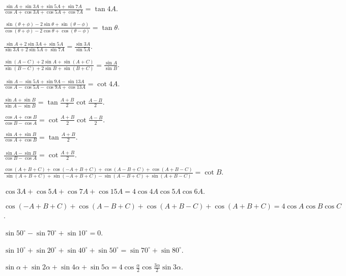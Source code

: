 \item $\frac{\sin A + \sin 3A + \sin 5A + \sin 7A}{\cos A + \cos 3A + \cos 5A + \cos 7A} = \tan 4A$.

\item $\frac{\sin (\theta + \phi) - 2\sin\theta + \sin (\theta - \phi)}{\cos (\theta + \phi) - 2\cos \theta + \cos(\theta -
    \phi)} = \tan\theta$.

\item $\frac{\sin A + 2\sin 3A + \sin 5A}{\sin 3A + 2\sin 5A + \sin 7A} = \frac{\sin 3A}{\sin 5A}$.

\item $\frac{\sin(A - C) + 2\sin A + \sin(A + C)}{\sin (B - C) + 2\sin B + \sin(B + C)} = \frac{\sin A}{\sin B}$.

\item $\frac{\sin A - \sin 5A + \sin 9A - \sin 13A}{\cos A - \cos 5A - \cos 9A + \cos 13 A} = \cot 4A$.

\item $\frac{\sin A + \sin B}{\sin A - \sin B} = \tan \frac{A + B}{2}\cot \frac{A - B}{2}$.

\item $\frac{\cos A + \cos B}{\cos B - \cos A} = \cot \frac{A + B}{2}\cot \frac{A - B}{2}$.

\item $\frac{\sin A + \sin B}{\cos A + \cos B} = \tan \frac{A + B}{2}$.

\item $\frac{\sin A - \sin B}{\cos B - \cos A} = \cot \frac{A + B}{2}$.

\item $\frac{\cos(A + B + C) + \cos(-A + B + C) + \cos(A - B + C) + \cos(A + B - C)}{\sin(A + B + C)+\sin(-A + B + C) -
    \sin(A - B + C) + \sin(A + B - C)} = \cot B$.

\item $\cos 3A + \cos 5A + \cos 7A + \cos 15A = 4 \cos 4A\cos 5A \cos 6A$.

\item $\cos(-A + B + C) + \cos(A - B + C) + \cos(A + B - C) + \cos(A + B + C) = 4\cos A\cos B\cos C$.

\item $\sin 50^\circ - \sin 70^\circ + \sin 10^\circ = 0$.

\item $\sin 10^\circ + \sin 20^\circ + \sin 40^\circ + \sin 50^\circ = \sin 70^\circ + \sin 80^\circ$.

\item $\sin\alpha + \sin 2\alpha + \sin 4\alpha + \sin 5\alpha = 4\cos \frac{\alpha}{2}\cos \frac{3\alpha}{2}\sin 3\alpha$.
\stopitemize

